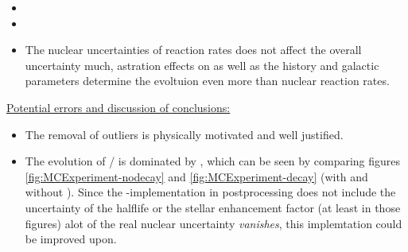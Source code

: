 \begin{itemize}
\item {}
  \item {}
  \item The nuclear uncertainties of reaction rates does not affect the overall uncertainty much, astration effects on  as well as the history and galactic parameters determine the evoltuion even more than nuclear reaction rates.
\end{itemize}

\underline{Potential errors and discussion of conclusions:}
\begin{itemize}
\item The removal of outliers is physically motivated and well justified.
\item The evolution of / is dominated by \betadecay, which can be seen by comparing figures \ref{fig:MCExperiment-nodecay} and \ref{fig:MCExperiment-decay} (with and without \betadecay). Since the \betadecay-implementation in postprocessing does not include the uncertainty of the  halflife or the stellar enhancement factor (at least in those figures) alot of the real nuclear uncertainty \textit{vanishes}, this implemtation could be improved upon.
\end{itemize}
\fi
